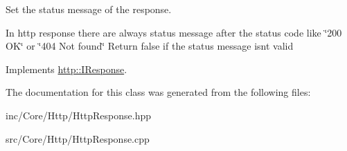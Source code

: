 Set the status message of the response. 

In http response there are always status message after the status code like \char`\"{}200 O\+K\char`\"{} or \char`\"{}404 Not found\char`\"{} Return false if the status message isn\textquotesingle{}t valid 

Implements \hyperlink{structhttp_1_1IResponse_ae2a223c2d714b456f2a064e13cafc2e2}{http\+::\+I\+Response}.



The documentation for this class was generated from the following files\+:\begin{DoxyCompactItemize}
\item 
inc/\+Core/\+Http/Http\+Response.\+hpp\item 
src/\+Core/\+Http/Http\+Response.\+cpp\end{DoxyCompactItemize}
